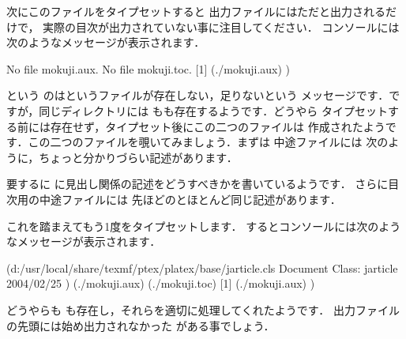 次にこのファイルをタイプセットすると
出力ファイルにはただと出力されるだけで，
実際の目次が出力されていない事に注目してください．
コンソールには次のようなメッセージが表示されます．

\begin{OutTerm}
 No file mokuji.aux.
 No file mokuji.toc.
 [1] (./mokuji.aux) )
\end{OutTerm}
%

 という
のはというファイルが存在しない，足りないという
メッセージです．ですが，同じディレクトリには
もも存在するようです．どうやら
タイプセットする前には存在せず，タイプセット後にこの二つのファイルは
作成されたようです．この二つのファイルを覗いてみましょう．まずは%
中途ファイルには
次のように，ちょっと分かりづらい記述があります．

\begin{InTeX}
\relax
{}
\end{InTeX}

要するに%
に見出し関係の記述をどうすべきかを書いているようです．
さらに目次用の中途ファイルには
先ほどのとほとんど同じ記述があります．

\begin{InTeX}
\end{InTeX}

これを踏まえてもう1度をタイプセットします．
するとコンソールには次のようなメッセージが表示されます．

\begin{OutTerm}
(d:/usr/local/share/texmf/ptex/platex/base/jarticle.cls
Document Class: jarticle 2004/02/25
) (./mokuji.aux) (./mokuji.toc) [1] (./mokuji.aux) )
\end{OutTerm}

どうやらも
も存在し，それらを適切に処理してくれたようです．
出力ファイルの先頭には始め出力されなかった
がある事でしょう．

